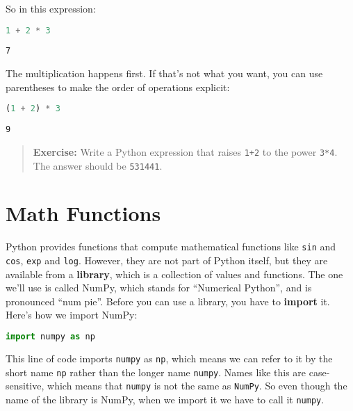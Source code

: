 So in this expression:

\begin{lstlisting}[language=Python,style=source]
1 + 2 * 3
\end{lstlisting}

\begin{lstlisting}[style=output]
7
\end{lstlisting}

The multiplication happens first. If that's not what you want, you can
use parentheses to make the order of operations explicit:

\begin{lstlisting}[language=Python,style=source]
(1 + 2) * 3
\end{lstlisting}

\begin{lstlisting}[style=output]
9
\end{lstlisting}

\begin{quote}
\textbf{Exercise:} Write a Python expression that raises
\passthrough{\lstinline!1+2!} to the power
\passthrough{\lstinline!3*4!}. The answer should be
\passthrough{\lstinline!531441!}.
\end{quote}

\hypertarget{math-functions}{%
\section{Math Functions}\label{math-functions}}

Python provides functions that compute mathematical functions like
\passthrough{\lstinline!sin!} and \passthrough{\lstinline!cos!},
\passthrough{\lstinline!exp!} and \passthrough{\lstinline!log!}.
However, they are not part of Python itself, but they are available from
a \textbf{library}, which is a collection of values and functions. The
one we'll use is called NumPy, which stands for ``Numerical Python'',
and is pronounced ``num pie''. Before you can use a library, you have to
\textbf{import} it. Here's how we import NumPy:

\begin{lstlisting}[language=Python,style=source]
import numpy as np
\end{lstlisting}

This line of code imports \passthrough{\lstinline!numpy!} as
\passthrough{\lstinline!np!}, which means we can refer to it by the
short name \passthrough{\lstinline!np!} rather than the longer name
\passthrough{\lstinline!numpy!}. Names like this are case-sensitive,
which means that \passthrough{\lstinline!numpy!} is not the same as
\passthrough{\lstinline!NumPy!}. So even though the name of the library
is NumPy, when we import it we have to call it
\passthrough{\lstinline!numpy!}.

